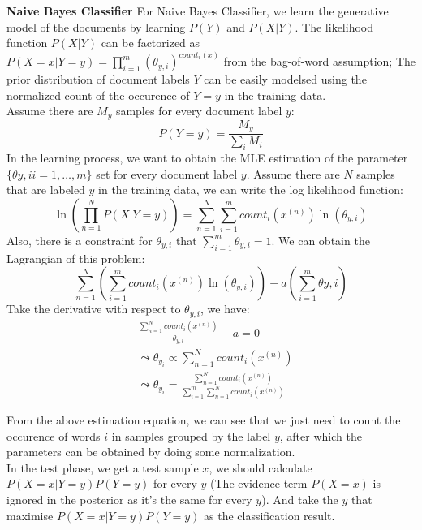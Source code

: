 \documentclass{article}
\theoremstyle{definition}
\theoremstyle{definition}
\theoremstyle{remark}
\begin{document}
\begin{addmargin}[3em]{2em}
  \textbf{Naive Bayes Classifier}
  For Naive Bayes Classifier, we learn the generative model of the documents by learning $P(Y)$ and $P(X|Y)$. The likelihood function $P(X|Y)$ can be factorized as $P(X = x|Y = y) = \prod_{i=1}^m (\theta_{y,i})^{count_i(x)}$ from the bag-of-word assumption; The prior distribution of document labels $Y$ can be easily modelsed using the normalized count of the occurence of $Y=y$ in the training data.\\
  Assume there are $M_y$ samples for every document label $y$:
  \[
  P(Y = y) = \frac{M_y}{\sum_{i} M_i}
  \]
  In the learning process, we want to obtain the MLE estimation of the parameter $\{\theta{y, i} i=1,\dots, m\}$ set for every document label $y$. Assume there are $N$ samples that are labeled $y$ in the training data, we can write the log likelihood function:
  \[
  \ln(\prod_{n=1}^N P(X | Y=y)) = \sum_{n=1}^N \sum_{i=1}^m count_i(x^{(n)}) \ln(\theta_{y,i})
  \]
  Also, there is a constraint for $\theta_{y,i}$ that $\sum_{i=1}^{m} \theta_{y, i} = 1$. We can obtain the Lagrangian of this problem:
  \[
  \sum_{n=1}^N (\sum_{i=1}^m count_i(x^{(n)}) \ln(\theta_{y,i})) - a(\sum_{i=1}^m \theta{y, i})
  \]
  Take the derivative with respect to $\theta_{y, i}$, we have:
  \[
  \begin{split}
    & \frac{\sum_{n=1}^N count_i(x^{(n)})}{\theta_{y, i}} - a = 0\\
    & \leadsto \theta_{y_i} \propto \sum_{n=1}^N count_i(x^{(n)})\\
    & \leadsto \theta_{y_i} = \frac{\sum_{n=1}^N count_i(x^{(n)})}{\sum_{i=1}^m \sum_{n=1}^N count_i(x^{(n)})}
  \end{split}
  \]

  From the above estimation equation, we can see that we just need to count the occurence of words $i$ in samples grouped by the label $y$, after which the parameters can be obtained by doing some normalization.\\

  In the test phase, we get a test sample $x$, we should calculate $P(X=x|Y=y)P(Y=y)$ for every $y$ (The evidence term $P(X=x)$ is ignored in the posterior as it's the same for every $y$). And take the $y$ that maximise $P(X=x|Y=y)P(Y=y)$ as the classification result.\\


\end{addmargin}
\end{document}
